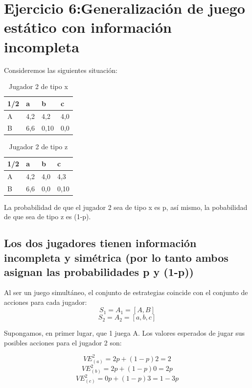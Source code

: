 \documentclass{article}
\begin{document}
\section{Ejercicio 6:Generalizaci\'on de juego est\'atico con informaci\'on incompleta}
Consideremos las siguientes situaci\'on:
\begin{table}[htbp]
\begin{center}
\begin{tabular}{|l|l|l|l|}
\hline
1/2 & a & b & c \\
\hline \hline
A & 4,2 & 4,2 & 4,0 \\ \hline
B & 6,6 & 0,10 & 0,0 \\ \hline

\end{tabular}
\caption{Jugador 2 de tipo x}
\label{tabla:sencilla}
\end{center}
\end{table}

\begin{table}[htbp]
\begin{center}
\begin{tabular}{|l|l|l|l|}
\hline
1/2 & a & b & c \\
\hline \hline
A & 4,2 & 4,0 & 4,3 \\ \hline
B & 6,6 & 0,0 & 0,10 \\ \hline

\end{tabular}
\caption{Jugador 2 de tipo z}
\label{tabla:sencilla}
\end{center}
\end{table}



La probabilidad de que el jugador 2 sea de tipo x es p, as\'i mismo, la pobabilidad de que sea de tipo z es (1-p).


\subsection{Los dos jugadores tienen informaci\'on incompleta y sim\'etrica (por lo tanto ambos asignan las probabilidades p y (1-p))}

Al ser un juego simult\'aneo, el conjunto de estrategias coincide con el conjunto de acciones para cada jugador:
$$S_1=A_1=[A,B]$$
$$S_2=A_2=[a,b,c]$$

Supongamos, en primer lugar, que 1 juega A. Los valores esperados de jugar sus posibles acciones para el jugador 2 son:

$$VE^2_{(a)}=2p+(1-p)2=2$$
$$VE^2_{(b)}=2p+(1-p)0=2p$$
$$VE^2_{(c)}=0p+(1-p)3=1-3p$$
\end{document}
